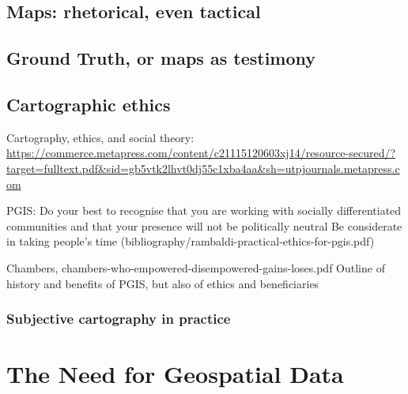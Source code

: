 \documentclass[11pt]{report}
\begin{document}
\section{Maps: rhetorical, even tactical}
\section{Ground Truth, or maps as testimony}

\section{Cartographic ethics}

Cartography, ethics, and social theory: \url{https://commerce.metapress.com/content/c21115120603xj14/resource-secured/?target=fulltext.pdf&sid=gb5vtk2lhvt0dj55c1xba4aa&sh=utpjournals.metapress.com}


PGIS: 
Do your best to recognise that you are working with socially differentiated communities and that your presence will not be politically neutral
Be considerate in taking people’s time
(bibliography/rambaldi-practical-ethics-for-pgis.pdf)

Chambers, chambers-who-empowered-disempowered-gains-loses.pdf
Outline of history and benefits of PGIS, but also of ethics and beneficiaries

\subsection{Subjective cartography in practice}

\chapter{The Need for Geospatial Data}
\end{document}
